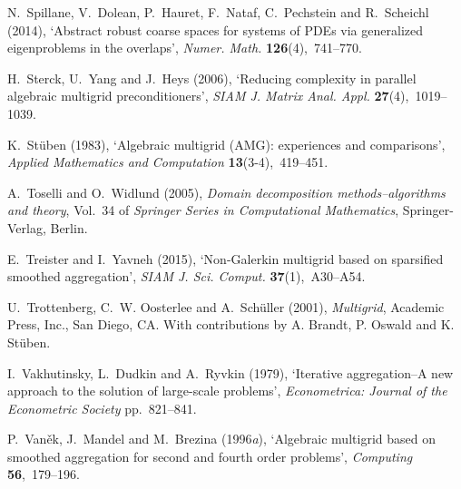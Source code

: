 \documentclass[12pt]{acta_2011xz}
\begin{document}
\begin{thebibliography}{xx}
N.~Spillane, V.~Dolean, P.~Hauret, F.~Nataf, C.~Pechstein and R.~Scheichl
  (2014), `Abstract robust coarse spaces for systems of {PDE}s via generalized
  eigenproblems in the overlaps', {\em Numer. Math.} {\bf 126}(4),~741--770.

H.~Sterck, U.~Yang and J.~Heys  (2006), `Reducing complexity in parallel
  algebraic multigrid preconditioners', {\em SIAM J. Matrix Anal. Appl.} {\bf
  27}(4),~1019--1039.

K.~St\"{u}ben  (1983), `{Algebraic multigrid ({A}{M}{G}): experiences and
  comparisons}', {\em Applied Mathematics and Computation} {\bf
  13}(3-4),~419--451.

A.~Toselli and O.~Widlund  (2005), {\em Domain decomposition
  methods--algorithms and theory}, Vol.~34 of {\em Springer Series in
  Computational Mathematics}, Springer-Verlag, Berlin.

E.~Treister and I.~Yavneh  (2015), `Non-{G}alerkin multigrid based on
  sparsified smoothed aggregation', {\em SIAM J. Sci. Comput.} {\bf
  37}(1),~A30--A54.

U.~Trottenberg, C.~W. Oosterlee and A.~Sch{\"{u}}ller  (2001), {\em Multigrid},
  Academic Press, Inc., San Diego, CA.
\newblock With contributions by A. Brandt, P. Oswald and K. St{\"{u}}ben.

I.~Vakhutinsky, L.~Dudkin and A.~Ryvkin  (1979), `{Iterative aggregation--A new
  approach to the solution of large-scale problems}', {\em Econometrica:
  Journal of the Econometric Society} pp.~821--841.

P.~Van{\v{e}}k, J.~Mandel and M.~Brezina  (1996{\em a}), `Algebraic multigrid
  based on smoothed aggregation for second and fourth order problems', {\em
  Computing} {\bf 56},~179--196.


\end{thebibliography}
\end{document}
